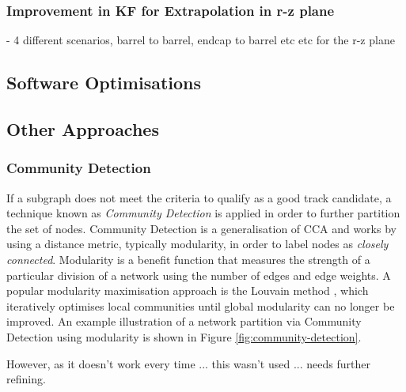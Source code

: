 \subsubsection{Improvement in KF for Extrapolation in r-z plane}

- 4 different scenarios, barrel to barrel, endcap to barrel etc etc for the r-z plane







\subsection{Software Optimisations}






\subsection{Other Approaches}
\subsubsection{Community Detection}

If a subgraph does not meet the criteria to qualify as a good track candidate, a technique known as \textit{Community Detection} \cite{community} is applied in order to further partition the set of nodes. Community Detection is a generalisation of CCA and works by using a distance metric, typically modularity, in order to label nodes as \textit{closely connected}. Modularity is a benefit function that measures the strength of a particular division of a network using the number of edges and edge weights. A popular modularity maximisation approach is the Louvain method \cite{python_louvain}, which iteratively optimises local communities until global modularity can no longer be improved. An example illustration of a network partition via Community Detection using modularity is shown in Figure \ref{fig:community-detection}. 

However, as it doesn't work every time ... this wasn't used ... needs further refining.




